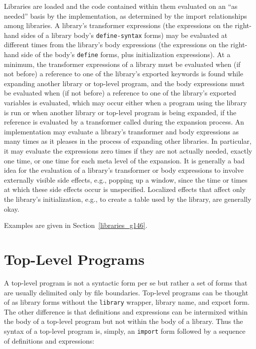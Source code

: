 Libraries are loaded and the code contained within them evaluated on
an ``as needed'' basis by the implementation, as determined by the
import relationships among libraries.
A library's transformer expressions (the expressions on the right-hand
sides of a library body's \texttt{define-syntax} forms) may be evaluated
at different times from the library's body expressions (the expressions on
the right-hand side of the body's \texttt{define} forms, plus
initialization expressions).
At a minimum, the transformer expressions of a library must be evaluated
when (if not before) a reference to one of the library's exported keywords
is found while expanding another library or top-level program, and the
body expressions must be evaluated when (if not before) a reference to one
of the library's exported variables is evaluated, which may occur either
when a program using the library is run or when another library or
top-level program is being expanded, if the reference is evaluated by a
transformer called during the expansion process.
An implementation may evaluate a library's transformer and body expressions
as many times as it pleases in the process of expanding other libraries.
In particular, it may evaluate the expressions zero times if they are not
actually needed, exactly one time, or one time for each meta level of the
expansion.
It is generally a bad idea for the evaluation of a library's transformer
or body expressions to involve externally visible side effects, e.g.,
popping up a window, since the time or times at which these side effects
occur is unspecified.
Localized effects that affect only the library's initialization,
e.g., to create a table used by the library, are generally okay.


Examples are given in Section \ref{libraries_g146}.


\section{\label{libraries_g145}\label{libraries_h3}Top-Level Programs\label{libraries_SECTLIBPROGRAMS}}



A top-level program is not a syntactic form per se but rather a
set of forms that are usually delimited only by file boundaries.
Top-level programs can be thought of as library forms without the
\texttt{library} wrapper, library name, and export form.
The other difference is that definitions and expressions can
be intermixed within the body of a top-level program but not
within the body of a library.
Thus the syntax of a top-level program is, simply, an \texttt{import}
form followed by a sequence of definitions and expressions:


